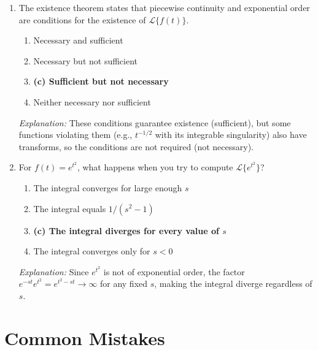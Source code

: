 \documentclass[12pt,a4paper]{article}
\begin{document}
\begin{enumerate}[label=\textbf{MCQ \arabic*.}]
\item The existence theorem states that piecewise continuity and exponential order are \underline{\hspace{1.5cm}} conditions for the existence of $\mathcal{L}\{f(t)\}$.
\begin{enumerate}[label=(\alph*)]
  \item Necessary and sufficient
  \item Necessary but not sufficient
  \item \textbf{(c) Sufficient but not necessary}
  \item Neither necessary nor sufficient
\end{enumerate}
\textit{Explanation:} These conditions guarantee existence (sufficient), but some functions violating them (e.g., $t^{-1/2}$ with its integrable singularity) also have transforms, so the conditions are not required (not necessary).

\item For $f(t) = e^{t^2}$, what happens when you try to compute $\mathcal{L}\{e^{t^2}\}$?
\begin{enumerate}[label=(\alph*)]
  \item The integral converges for large enough $s$
  \item The integral equals $1/(s^2 - 1)$
  \item \textbf{(c) The integral diverges for every value of $s$}
  \item The integral converges only for $s < 0$
\end{enumerate}
\textit{Explanation:} Since $e^{t^2}$ is not of exponential order, the factor $e^{-st}e^{t^2} = e^{t^2 - st} \to \infty$ for any fixed $s$, making the integral diverge regardless of $s$.

\end{enumerate}

\section{Common Mistakes}
\end{document}
